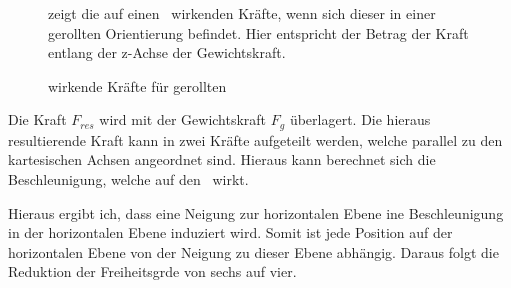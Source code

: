 \begin{figure}[ht!]
\vspace{0.25cm}
\begin{center}
\caption{wirkende Kräfte für gerollten \Quad\ }
\label{fig:ForcesRolled}
\end{center}

\vspace{0.25cm}
 zeigt die auf einen \Quad\ wirkenden Kräfte, wenn sich dieser in einer gerollten Orientierung befindet. Hier entspricht der Betrag der Kraft entlang der z-Achse der Gewichtskraft.
\end{figure}


Die Kraft $F_{res}$ wird mit der Gewichtskraft $F_g$ überlagert. Die hieraus resultierende Kraft kann in zwei Kräfte aufgeteilt werden, welche parallel zu den kartesischen Achsen angeordnet sind. Hieraus kann berechnet sich die Beschleunigung, welche auf den \Quad\ wirkt.





Hieraus ergibt ich, dass eine Neigung zur horizontalen Ebene ine Beschleunigung in der horizontalen Ebene induziert wird. Somit ist jede Position auf der horizontalen Ebene von der Neigung zu dieser Ebene abhängig. Daraus folgt die Reduktion der Freiheitsgrde von sechs auf vier.

